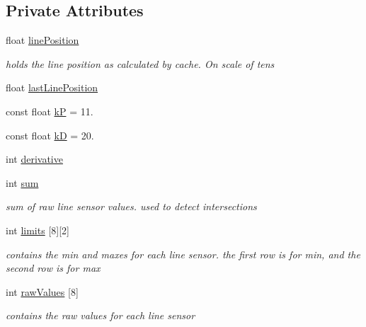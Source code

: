 \subsection*{Private Attributes}
\begin{DoxyCompactItemize}
\item 
float \hyperlink{classLineSensor_ac21af83a73e9e55500324d9d34ed2498}{line\-Position}
\begin{DoxyCompactList}\small\item\em holds the line position as calculated by cache. On scale of tens \end{DoxyCompactList}\item 
float \hyperlink{classLineSensor_a347e843234a242ded12e83badf4718ed}{last\-Line\-Position}
\item 
const float \hyperlink{classLineSensor_af246497cb5a3386afcc4ce864949c57f}{k\-P} = 11.
\item 
const float \hyperlink{classLineSensor_a62c587ff3d58f72a74ae39429b7d0837}{k\-D} = 20.
\item 
int \hyperlink{classLineSensor_aa5bd7119b2332eab8b6c850f8fa3d558}{derivative}
\item 
int \hyperlink{classLineSensor_af574319adc88f5949f03239b2bcbc222}{sum}
\begin{DoxyCompactList}\small\item\em sum of raw line sensor values. used to detect intersections \end{DoxyCompactList}\item 
int \hyperlink{classLineSensor_ae17bcec64c67b17748d50401e79d5c6f}{limits} \mbox{[}8\mbox{]}\mbox{[}2\mbox{]}
\begin{DoxyCompactList}\small\item\em contains the min and maxes for each line sensor. the first row is for min, and the second row is for max \end{DoxyCompactList}\item 
int \hyperlink{classLineSensor_a0d48bb25f8e1ee25a4757b9e201bd1a9}{raw\-Values} \mbox{[}8\mbox{]}
\begin{DoxyCompactList}\small\item\em contains the raw values for each line sensor \end{DoxyCompactList}\end{DoxyCompactItemize}
